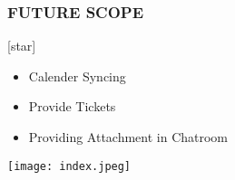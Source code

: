 \documentclass{beamer}
\begin{document}
    \begin{frame}
		\frametitle{FUTURE SCOPE}
    	[star]
        \begin{itemize}
            \item <1 -> Calender Syncing
	    \item <2 -> Provide Tickets
	    \item <3 -> Providing Attachment in Chatroom
        \end{itemize}
    \end{frame}
    
    \begin{frame}
        \texttt{[image: index.jpeg]}
    \end{frame}
	
\end{document}
